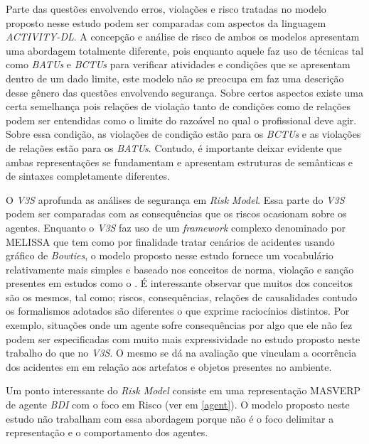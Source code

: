 Parte das questões envolvendo erros, violações e risco tratadas no modelo proposto nesse estudo podem ser comparadas com aspectos da linguagem \textit{ACTIVITY-DL}. A concepção e análise de risco de ambos os modelos apresentam uma abordagem totalmente diferente, pois enquanto aquele faz uso de técnicas tal como \textit{BATUs} e \textit{BCTUs} para verificar atividades e condições que se apresentam dentro de um dado limite, este modelo não se preocupa em faz uma descrição desse gênero das questões envolvendo segurança. Sobre certos aspectos existe uma certa semelhança pois relações de violação tanto de condições como de relações podem ser entendidas como o limite do razoável no qual o profissional deve agir. Sobre essa condição, as violações de condição estão para os \textit{BCTUs} e as violações de relações estão para os \textit{BATUs}. Contudo, é importante deixar evidente que ambas representações se fundamentam e apresentam estruturas de semânticas e de sintaxes completamente diferentes. 

O \textit{V3S} aprofunda as análises de segurança em \textit{Risk Model}. Essa parte do \textit{V3S} podem ser comparadas com as consequências que os riscos ocasionam sobre os agentes. Enquanto 
o \textit{V3S} faz uso de um \textit{framework} complexo denominado por MELISSA que tem como por finalidade tratar cenários de acidentes usando gráfico de \textit{Bowties}, o modelo proposto nesse estudo fornece um vocabulário relativamente mais simples e baseado nos conceitos de norma, violação e sanção presentes em estudos como o \cite{dastaniframework}. É interessante observar que muitos dos conceitos são os mesmos, tal como; riscos, consequências, relações de causalidades contudo os formalismos adotados são diferentes o que exprime raciocínios distintos. Por exemplo, situações onde um agente sofre consequências por algo que ele não fez podem ser especificadas com muito mais expressividade no estudo proposto neste trabalho do que no \textit{V3S}. O mesmo se dá na avaliação que vinculam a ocorrência dos acidentes em em relação aos artefatos e objetos presentes no ambiente. 

Um ponto interessante do \textit{Risk Model} consiste em uma representação MASVERP  de agente \textit{BDI} com o foco em Risco (ver em \ref{agent}). O modelo proposto neste estudo não trabalham com essa abordagem porque não é o foco delimitar a representação e o comportamento dos agentes.

